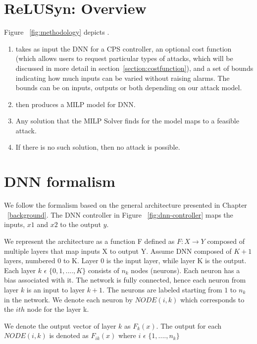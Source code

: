 \section{ReLUSyn: Overview}
Figure ~\ref{fig:methodology} depicts \tool.
\begin{enumerate}
	\item \tool takes as input the DNN for a CPS controller, an optional cost function (which allows users to request particular types of attacks, which will be discussed in more detail in section~\ref{section:costfunction}), and a set of bounds indicating how much inputs can be varied without raising alarms. The bounds can be on inputs, outputs or both depending on our attack model. 
	\item \tool then produces a \ac{MILP} model for \ac{DNN}.
	\item Any solution that the  \ac{MILP} Solver finds for the model maps to a feasible attack.
	\item If there is no such solution, then no attack is possible.
\end{enumerate}

	
\section{DNN formalism}
We follow the formalism based on the general architecture presented in Chapter ~\ref{background}. 
The \ac{DNN} controller in
 Figure ~\ref{fig:dnn-controller} maps the inputs, $x1$ and $x2$ to the output $y$. 



We represent the architecture as a function F defined as $F: X \rightarrow Y$ composed of multiple layers that map inputs X to output Y. 
Assume \ac{DNN} composed of $K + 1$ layers, numbered 0 to K.
Layer 0 %
is the input layer, while layer K is the output.
Each layer $k$ $\epsilon$ $\{0,1,....,K\}$ consists of $n_k$ nodes (neurons).
Each neuron has a bias associated with it. 
The network is fully connected, hence each neuron from layer $k$ is an input to layer $k+1$. 
The neurons are labeled starting from $1$ to $n_k$ in the network. 
We denote each neuron by $NODE(i,k)$ which corresponds to the $ith$ node for the layer k. 

We denote the output vector of layer $k$ as $F_k(x)$.
The output for each $NODE(i,k)$ is denoted as $F_{ik}(x)$ where $i$ $\epsilon$ $\{1,....,n_k\}$ 

